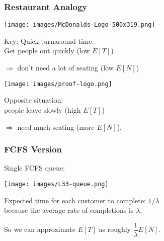 \begin{frame}
\frametitle{Restaurant Analogy}

\begin{minipage}{.49\textwidth}
\begin{center}
\texttt{[image: images/McDonalds-Logo-500x319.png]}
\end{center}

Key: Quick turnaround time. \\

Get people out quickly (low $E[T]$) 

$\Rightarrow$ don't need a lot of seating (low $E[N]$)
\end{minipage} \begin{minipage}{.49\textwidth}
\begin{center}
\texttt{[image: images/proof-logo.png]}
\end{center}

\begin{changemargin}{1em}
Opposite situation: \\

people leave slowly (high $E[T]$) 

$\Rightarrow$ need much seating (more $E[N]$). 
\end{changemargin}
\end{minipage}

\end{frame}



\begin{frame}
\frametitle{FCFS Version}

\large
\begin{changemargin}{2cm}
Single FCFS queue:

\begin{center}
\texttt{[image: images/L33-queue.png]}
\end{center}

Expected time for each customer to complete: $1/\lambda$\\
\qquad because the average rate of completions is $\lambda $. 

So we can approximate $E[T]$ as roughly $\dfrac{1}{\lambda}E[N]$.
\end{changemargin}

\end{frame}




